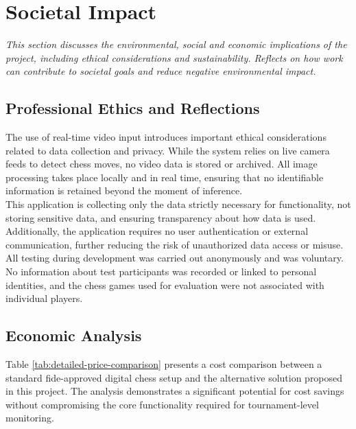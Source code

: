 \chapter{Societal Impact}

\begin{center}
    \textit{This section discusses the environmental, social and economic implications of the project, including ethical considerations and sustainability. Reflects on how work can contribute to societal goals and reduce negative environmental impact.}
\end{center}

\section{Professional Ethics and Reflections}
The use of real-time video input introduces important ethical considerations related to data collection and privacy. While the system relies on live camera feeds to detect chess moves, no video data is stored or archived. All image processing takes place locally and in real time, ensuring that no identifiable information is retained beyond the moment of inference. \\

This application is collecting only the data strictly necessary for functionality, not storing sensitive data, and ensuring transparency about how data is used. Additionally, the application requires no user authentication or external communication, further reducing the risk of unauthorized data access or misuse. \\

All testing during development was carried out anonymously and was voluntary. No information about test participants was recorded or linked to personal identities, and the chess games used for evaluation were not associated with individual players. \\

\section{Economic Analysis}
Table \ref{tab:detailed-price-comparison} presents a cost comparison between a standard \gls{fide}-approved digital chess setup and the alternative solution proposed in this project. The analysis demonstrates a significant potential for cost savings without compromising the core functionality required for tournament-level monitoring. \\

